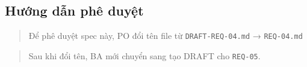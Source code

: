 \subsection{Hướng dẫn phê duyệt}

\begin{quote}
Để phê duyệt spec này, PO đổi tên file từ \texttt{DRAFT-REQ-04.md} → \texttt{REQ-04.md}
\end{quote}

\begin{quote}
Sau khi đổi tên, BA mới chuyển sang tạo DRAFT cho \texttt{REQ-05}.
\end{quote}

